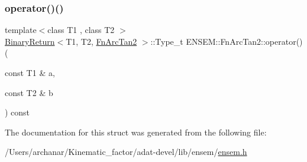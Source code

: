 \subsubsection{\texorpdfstring{operator()()}{operator()()}\hspace{0.1cm}{\footnotesize\ttfamily [3/3]}}
{\footnotesize\ttfamily template$<$class T1 , class T2 $>$ \\
\mbox{\hyperlink{structENSEM_1_1BinaryReturn}{Binary\+Return}}$<$T1, T2, \mbox{\hyperlink{structENSEM_1_1FnArcTan2}{Fn\+Arc\+Tan2}} $>$\+::Type\+\_\+t E\+N\+S\+E\+M\+::\+Fn\+Arc\+Tan2\+::operator() (\begin{DoxyParamCaption}\item[{const T1 \&}]{a,  }\item[{const T2 \&}]{b }\end{DoxyParamCaption}) const\hspace{0.3cm}{\ttfamily [inline]}}



The documentation for this struct was generated from the following file\+:\begin{DoxyCompactItemize}
\item 
/\+Users/archanar/\+Kinematic\+\_\+factor/adat-\/devel/lib/ensem/\mbox{\hyperlink{adat-devel_2lib_2ensem_2ensem_8h}{ensem.\+h}}\end{DoxyCompactItemize}

